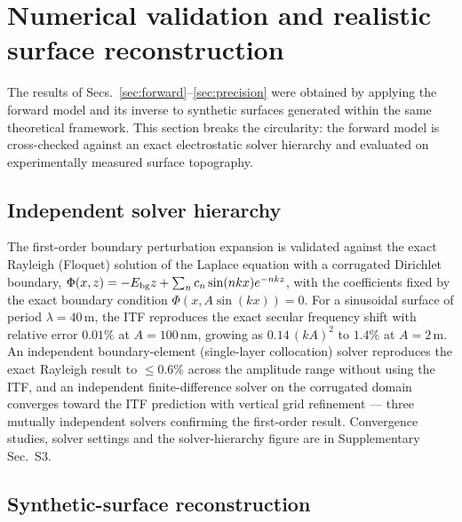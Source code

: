 \documentclass[12pt,a4paper]{article}
\begin{document}
\section{Numerical validation and realistic surface reconstruction}
\label{sec:validation}

The results of Secs.~\ref{sec:forward}--\ref{sec:precision} were obtained
by applying the forward model and its inverse to synthetic surfaces
generated within the same theoretical framework.  This section breaks the
circularity: the forward model is cross-checked against an exact
electrostatic solver hierarchy and evaluated on experimentally measured
surface topography.

\subsection{Independent solver hierarchy}

The first-order boundary perturbation expansion is validated against the
exact Rayleigh (Floquet) solution of the Laplace equation with a
corrugated Dirichlet boundary,
$\Phi(x,z)=-E_{\rm bg}z+\sum_n c_n\sin(nkx)e^{-nkz}$, with the
coefficients fixed by the exact boundary condition
$\Phi(x,A\sin(kx))=0$.  For a sinusoidal surface of period
$\lambda=40$\,\textmu m, the ITF reproduces the exact secular frequency
shift with relative error $0.01\%$ at $A=100$\,nm, growing as
$0.14\,(kA)^2$ to $1.4\%$ at $A=2$\,\textmu m.  An independent
boundary-element (single-layer collocation) solver reproduces the exact
Rayleigh result to $\le0.6\%$ across the amplitude range without using
the ITF, and an independent finite-difference solver on the corrugated
domain converges toward the ITF prediction with vertical grid refinement
--- three mutually independent solvers confirming the first-order
result.  Convergence studies, solver settings and the solver-hierarchy
figure are in Supplementary Sec.~S3.

\subsection{Synthetic-surface reconstruction}
\end{document}
